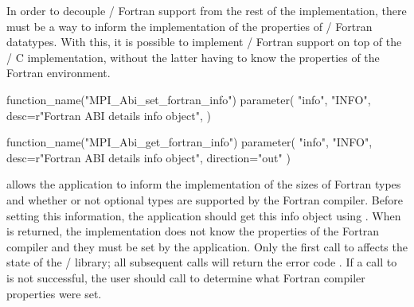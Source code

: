 In order to decouple \MPI/ Fortran support from the rest of the implementation,
there must be a way to inform the implementation of the properties of
\MPI/ Fortran datatypes.
With this, it is possible to implement \MPI/ Fortran support on top
of the \MPI/ C implementation, without the latter having to know the
properties of the Fortran environment.

\begin{mpi-binding}
    function_name("MPI_Abi_set_fortran_info")
    parameter(
        "info",
        "INFO",
        desc=r"Fortran ABI details info object",
    )
\end{mpi-binding}

\begin{mpi-binding}
    function_name("MPI_Abi_get_fortran_info")
    parameter(
        "info",
        "INFO",
        desc=r"Fortran ABI details info object",
        direction="out"
    )
\end{mpi-binding}

 allows the application
to inform the implementation of the sizes of Fortran types
and whether or not optional types are supported by the
Fortran compiler.
Before setting this information, the application should
get this info object using .
When  is returned, the implementation
does not know the properties of the Fortran compiler and they
must be set by the application.
Only the first call to 
affects the state of the \MPI/ library; all subsequent calls
will return the error code .
If a call to  is not
successful, the user should call 
to determine what Fortran compiler properties were set.

